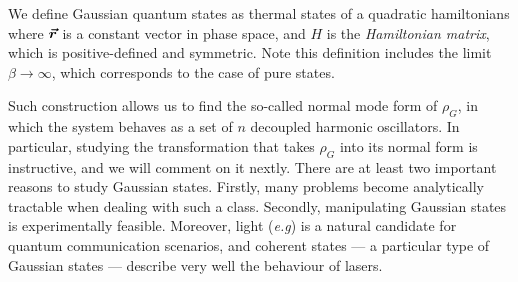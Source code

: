 We define Gaussian quantum states as thermal states of a quadratic hamiltonians
where $\bm{\vec{r}}$ is a constant vector in phase space, and $H$ is the \textit{Hamiltonian matrix}, which is positive-defined and symmetric. Note this definition includes the limit $\beta \rightarrow \infty$, which corresponds to the case of pure states.

Such construction allows us to find the so-called normal mode form of $\rho_G$, in which the system behaves as a set of $n$ decoupled harmonic oscillators. In particular, studying the transformation that takes $\rho_G$ into its normal form is instructive, and we will comment on it nextly. %
%
There are at least two important reasons to study Gaussian states. Firstly, many problems become analytically tractable when dealing with such a class. Secondly, manipulating Gaussian states is experimentally feasible. Moreover, light (\textit{e.g}) is a natural candidate for quantum communication scenarios, and coherent states --- a particular type of Gaussian states --- describe very well the behaviour of lasers.

